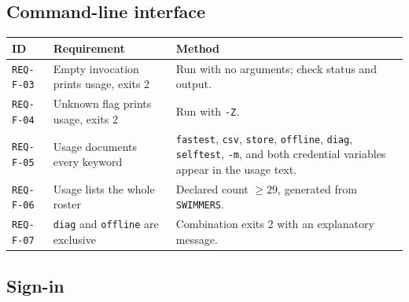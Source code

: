 \documentclass[12pt]{article}
\newcommand{\code}[1]{\texttt{#1}}
\newcommand{\req}[1]{\texttt{#1}}
\begin{document}
\subsection{Command-line interface}

\begin{center}
\begin{longtable}{p{2.1cm}p{5.2cm}p{6.2cm}}
  \toprule
  \textbf{ID} & \textbf{Requirement} & \textbf{Method} \\
  \midrule\endhead
  \req{REQ-F-03} & Empty invocation prints usage, exits 2
    & Run with no arguments; check status and output. \\
  \req{REQ-F-04} & Unknown flag prints usage, exits 2
    & Run with \code{-Z}. \\
  \req{REQ-F-05} & Usage documents every keyword
    & \code{fastest}, \code{csv}, \code{store}, \code{offline},
      \code{diag}, \code{selftest}, \code{-m}, and both credential
      variables appear in the usage text. \\
  \req{REQ-F-06} & Usage lists the whole roster
    & Declared count $\geq 29$, generated from \code{SWIMMERS}. \\
  \req{REQ-F-07} & \code{diag} and \code{offline} are exclusive
    & Combination exits 2 with an explanatory message. \\
  \bottomrule
\end{longtable}
\end{center}

\subsection{Sign-in}
\end{document}
